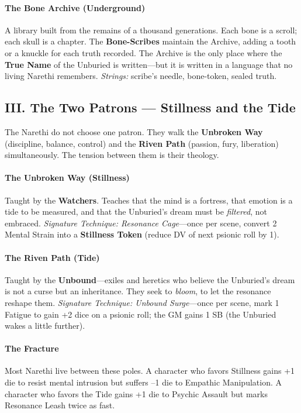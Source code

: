 \documentclass[11pt]{article}
\begin{document}
\paragraph{The Bone Archive (Underground)}
A library built from the remains of a thousand generations. Each bone is a scroll; each skull is a chapter. The \textbf{Bone-Scribes} maintain the Archive, adding a tooth or a knuckle for each truth recorded. The Archive is the only place where the \textbf{True Name} of the Unburied is written---but it is written in a language that no living Narethi remembers. \textit{Strings:} scribe's needle, bone-token, sealed truth.

\subsection*{III. The Two Patrons --- Stillness and the Tide}
The Narethi do not choose one patron. They walk the \textbf{Unbroken Way} (discipline, balance, control) and the \textbf{Riven Path} (passion, fury, liberation) simultaneously. The tension between them is their theology.

\paragraph{The Unbroken Way (Stillness)}
Taught by the \textbf{Watchers}. Teaches that the mind is a fortress, that emotion is a tide to be measured, and that the Unburied's dream must be \textit{filtered}, not embraced. \textit{Signature Technique: Resonance Cage}---once per scene, convert 2 Mental Strain into a \textbf{Stillness Token} (reduce DV of next psionic roll by 1).

\paragraph{The Riven Path (Tide)}
Taught by the \textbf{Unbound}---exiles and heretics who believe the Unburied's dream is not a curse but an inheritance. They seek to \textit{bloom}, to let the resonance reshape them. \textit{Signature Technique: Unbound Surge}---once per scene, mark 1 Fatigue to gain +2 dice on a psionic roll; the GM gains 1 SB (the Unburied wakes a little further).

\paragraph{The Fracture} Most Narethi live between these poles. A character who favors Stillness gains +1 die to resist mental intrusion but suffers --1 die to Empathic Manipulation. A character who favors the Tide gains +1 die to Psychic Assault but marks Resonance Leash twice as fast.
\end{document}
